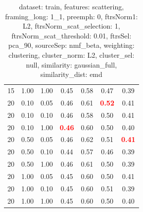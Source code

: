 \begin{table}
\begin{center}
\begin{tabular}{lllcccc}
15 & 1.00 & 1.00 & 0.45 & 0.58 & 0.47 & 0.39 \\ 
20 & 0.10 & 0.05 & 0.46 & 0.61 & \textbf{\textcolor{red}{0.52}} & 0.41 \\ 
20 & 0.10 & 0.10 & 0.46 & 0.58 & 0.50 & 0.41 \\ 
20 & 0.10 & 1.00 & \textbf{\textcolor{red}{0.46}} & 0.60 & 0.50 & 0.40 \\ 
20 & 0.50 & 0.05 & 0.46 & 0.62 & 0.51 & \textbf{\textcolor{red}{0.41}} \\ 
20 & 0.50 & 0.10 & 0.44 & 0.57 & 0.46 & 0.39 \\ 
20 & 0.50 & 1.00 & 0.46 & 0.61 & 0.50 & 0.39 \\ 
20 & 1.00 & 0.05 & 0.45 & 0.60 & 0.50 & 0.41 \\ 
20 & 1.00 & 0.10 & 0.45 & 0.60 & 0.51 & 0.39 \\ 
20 & 1.00 & 1.00 & 0.45 & 0.60 & 0.50 & 0.40 \\ 
\end{tabular} 
\end{center} 
\caption{dataset: train, features: scattering, framing\_long: 1\_1, preemph: 0, ftrsNorm1: L2, ftrsNorm\_scat\_selection: 1, ftrsNorm\_scat\_threshold: 0.01, ftrsSel: pca\_90, sourceSep: nmf\_beta, weighting: clustering, cluster\_norm: L2, cluster\_sel: null, similarity: gaussian\_full, similarity\_dist: emd} 
\label{datasetrFeaturscFraminlong1_1Preemp0Ftrsnorm1L2Ftrsnoscatselect1Ftrsnoscatthresh0.01Ftrsselpc90SourcesepnmbeWeightclClustenormL2ClusteselnuSimilagafuSimiladistem} 
\end{table} 
 
